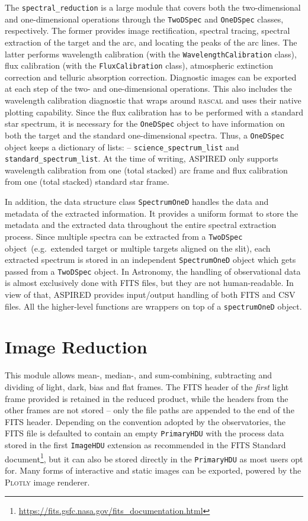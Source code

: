 \documentclass[linenumbers, twocolumn]{aastex631}
\begin{document}
The \texttt{spectral\_reduction} is a large module that covers both the
two-dimensional and one-dimensional operations through the \texttt{TwoDSpec} and
\texttt{OneDSpec} classes, respectively. The former provides image
rectification, spectral tracing, spectral extraction of the target and the
arc, and locating the peaks of the arc lines. The latter performs
wavelength calibration (with the \texttt{WavelengthCalibration} class),
flux calibration (with the \texttt{FluxCalibration} class), atmospheric
extinction correction and telluric absorption correction. Diagnostic images
can be exported at each step of the two- and one-dimensional operations.
This also includes the wavelength calibration diagnostic that wraps around
\textsc{rascal} and uses their native plotting capability.
Since the flux calibration has to be performed
with a standard star spectrum, it is necessary for the \texttt{OneDSpec}
object to have information on both the target and the standard one-dimensional
spectra. Thus, a \texttt{OneDSpec} object keeps a dictionary of lists: --
\texttt{science\_spectrum\_list} and \texttt{standard\_spectrum\_list}. At the
time of writing, \textsc{ASPIRED} only supports wavelength calibration from one (total
stacked) arc frame and flux calibration from one (total stacked) standard star frame.

In addition, the data structure class \texttt{SpectrumOneD} handles the
data and metadata of the extracted information. It provides a uniform format
to store the metadata and the extracted data throughout the entire spectral
extraction process. Since multiple spectra can be extracted from a
\texttt{TwoDSpec} object~(e.g.\ extended target or multiple targets aligned on
the slit), each extracted spectrum is stored in an independent
\texttt{SpectrumOneD} object which gets passed from a \texttt{TwoDSpec} object.
In Astronomy, the handling of observational
data is almost exclusively done with FITS files, but they are not
human-readable. In view of that, \textsc{ASPIRED} provides input/output handling
of both FITS and CSV files. All the higher-level functions are wrappers on top
of a \texttt{spectrumOneD} object.

\section{Image Reduction}
\label{sec:image_reduction}
This module allows mean-, median-, and sum-combining, subtracting and dividing
of light, dark, bias and flat frames. The FITS header of the \textit{first}
light frame provided is retained in the reduced product, while the headers
from the other frames
are not stored -- only the file paths are appended to the end of the FITS header. Depending on
the convention adopted by the observatories, the FITS file is defaulted to
contain an empty \texttt{PrimaryHDU} with the process data stored in the
first \texttt{ImageHDU} extension as recommended in the FITS Standard 
document\footnote{\url{https://fits.gsfc.nasa.gov/fits_documentation.html}},
but it can also be stored directly in the \texttt{PrimaryHDU} as most users
opt for. Many forms of interactive and static images can be exported,
powered by the \textsc{Plotly} image renderer.
\end{document}

